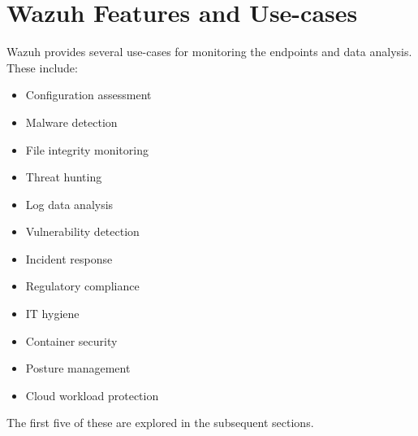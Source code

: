 \newpage
\section{Wazuh Features and Use-cases}

Wazuh provides several use-cases for monitoring the endpoints and data analysis. These include:
\begin{itemize}
    \item Configuration assessment
    \item Malware detection
    \item File integrity monitoring
    \item Threat hunting
    \item Log data analysis
    \item Vulnerability detection
    \item Incident response
    \item Regulatory compliance
    \item IT hygiene
    \item Container security
    \item Posture management
    \item Cloud workload protection
\end{itemize}

The first five of these are explored in the subsequent sections.






